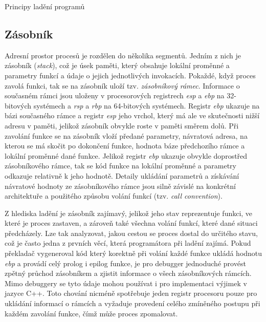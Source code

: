 \documentclass[bc,male,python,dept460]{diploma}						%
\newcommand{\parspace}[1][]{
	\ifthenelse{\isempty{#1}}{\vspace{5mm}}{\vspace{#1}}
	\par
}
\begin{document}
\begin{section}{Principy ladění programů}
	\subsection{Zásobník}
		Adresní prostor procesů je rozdělen do několika segmentů\cite[53]{tanenbaum}. Jedním z nich je zásobník (\textit{stack}), což je úsek paměti, který
		obsahuje lokální proměnné a parametry funkcí a údaje o jejich jednotlivých invokacích. Pokaždé, když proces zavolá funkci, tak se na zásobník uloží tzv.
		\textit{zásobníkový rámec}. Informace o současném rámci jsou uloženy v procesorových registrech \textit{esp} a \textit{ebp} na 32-bitových systémech
		a \textit{rsp} a \textit{rbp} na 64-bitových systémech. Registr \textit{ebp} ukazuje na bázi současného rámce a registr \textit{esp} jeho vrchol, který
		má ale ve skutečnosti nižší adresu v paměti, jelikož zásobník obvykle roste v paměti směrem dolů. Při zavolání funkce se na zásobník vloží předané parametry,
		návratová adresa, na kterou se má skočit po dokončení funkce, hodnota báze předchozího rámce a lokální proměnné dané funkce.
		Jelikož registr \textit{ebp} ukazuje obvykle doprostřed zásobníkového rámce, tak se kód funkce na lokální proměnné a parametry odkazuje
		relativně k jeho hodnotě. Detaily ukládání parametrů a získávání návratové hodnoty ze zásobníkového rámce jsou silně závislé na konkrétní architektuře
		a použitého způsobu volání funkcí (tzv. \textit{call convention}).
		
		
		\parspace Z hlediska ladění je zásobník zajímavý, jelikož jeho stav reprezentuje funkci, ve které je proces zastaven, a zároveň také všechna volání
		funkcí, které dané situaci předcházely. Lze tak analyzovat, jakou cestou se proces dostal do určitého stavu, což je často jedna z prvních věcí, která
		programátora při ladění zajímá. Pokud překladač vygeneroval kód který korektně při volání každé funkce ukládá hodnotu \textit{ebp} a provádí
		celý prolog i epilog funkce, je pro debugger jednoduché provést zpětný průchod zásobníkem a zjistit informace o všech zásobníkových rámcích.
		Mimo debuggery se tyto údaje mohou používat i pro implementaci výjimek v jazyce C++.
		Toto chování nicméně spotřebuje jeden registr procesoru pouze pro ukládání informací o rámcích a vyžaduje provedení celého zmíněného postupu při každém
		zavolání funkce, čímž může proces zpomalovat.
		

\end{section}
\end{document}
